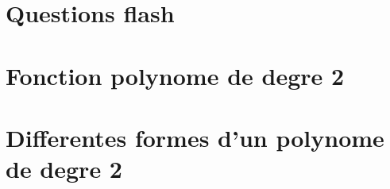 
\section{Questions flash}









\section{Fonction polynome de degre 2}







\section{Differentes formes d'un polynome de degre 2}


\newpage











\newpage


